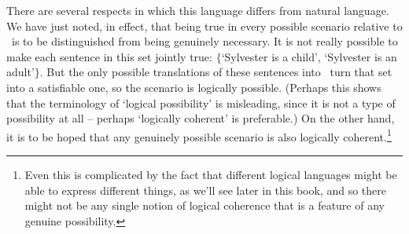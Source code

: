 There are several respects in which this language differs from natural language. We have just noted, in effect, that being true in every possible scenario relative to \lone\ is to be distinguished from being genuinely necessary. It is not really possible to make each sentence in this set jointly true: $\{$‘Sylvester is a child’, ‘Sylvester is an adult’$\}$. But the only possible translations of these sentences into \lone\ turn that set into a satisfiable one, so the scenario is logically possible. (Perhaps this shows that the terminology of ‘logical possibility’ is misleading, since it is not a type of possibility at all – perhaps ‘logically coherent’ is preferable.)  On the other hand, it is to be hoped that any genuinely possible scenario is also logically coherent.\footnote{Even this is complicated by the fact that different logical languages might be able to express different things, as we'll see later in this book, and so there might not be any single notion of logical coherence that is a feature of any genuine possibility.}

